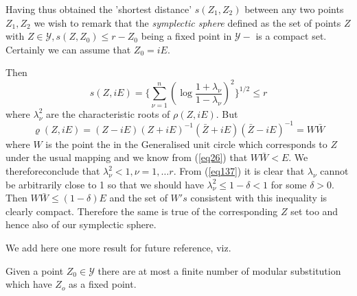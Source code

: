  Having thus obtained the 'shortest distance' $s(Z_1 ,Z_2)$
 between any two points $Z_1 , Z_2$ we wish to remark that the
 \textit{symplectic sphere} defined as the set of points $Z$ with $Z
 \in \mathscr{Y} , s(Z , Z_0) \le r -Z_0$ being a fixed point
 in $\mathscr{Y}-$ is a compact set. Certainly we can assume that $Z_0
 = iE$. 
 
 Then
 \begin{equation*}
s(Z , iE) = \bigg\{ \sum^n_{\nu = 1} (\log \frac{1 +
  \lambda_\nu}{1 - \lambda_\nu})^2 \bigg\}^{1/2} \le r \tag{137}\label{eq137} 
\end{equation*}
where $\lambda^2_\nu$ are the characteristic roots of $\rho(Z, i E)$. But 
$$
\varrho (Z , iE) =(Z - iE) (Z + iE)^{-1} (\bar{Z} + iE) (\bar{Z} -
iE)^{-1} = W \bar{W} 
$$
where $W$ is the point the in the Generalised unit circle which
corresponds to $Z$ under the usual mapping and we know from  (\ref{eq26})
that $W \bar{W} < E$. We therefore\pageoriginale  conclude that
$\lambda^2_\nu < 1, 
\nu = 1, \ldots r$. From (\ref{eq137}) it is clear that $\lambda_\nu$ cannot be
arbitrarily close to 1 so that we should have $\lambda^2_\nu \le  1 -
\delta < 1$ for some $\delta > 0$. Then $W \bar{W} \le (1 - \delta) E$
and the set of $W's$ consistent with this inequality is
clearly compact. Therefore the same is true of the corresponding $Z$
set too and hence also of our symplectic sphere. 

We add here one more result for future reference, viz.

\setcounter{lem}{10}
\begin{lem}\label{chap7:lem11}%
 Given a point $Z_0 \in \mathscr{Y}$ there are at most a
  finite number of modular substitution which have $Z_o$  as a
  fixed point. 
\end{lem}


